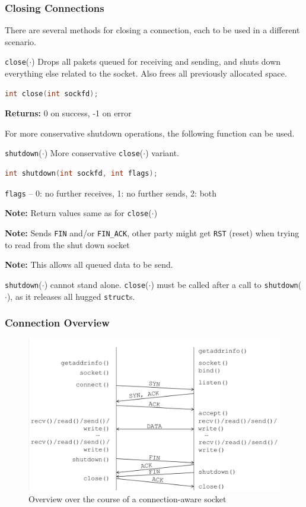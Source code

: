 \documentclass[english]{panikzettel}
\newcommand{\fkt}[1]{\texttt{#1}(\(\cdot\))}
\begin{document}
	\subsubsection{Closing Connections}

	There are several methods for closing a connection, each to be used in a different scenario.

	\begin{defi}{\fkt{close}}
		Drops all pakets queued for receiving and sending, and shuts down everything else related to the socket. Also frees all previously allocated space.
		\begin{lstlisting}[language=C]
			int close(int sockfd);
		\end{lstlisting}
		\tcblower
		\textbf{Returns:} 0 on success, -1 on error
	\end{defi}

	For more conservative shutdown operations, the following function can be used.

	\begin{defi}{\fkt{shutdown}}
		More conservative \fkt{close} variant.
		\begin{lstlisting}[language=C]
			int shutdown(int sockfd, int flags);
		\end{lstlisting}
		\tcblower
		\texttt{flags} – 0: no further receives, 1: no further sends, 2: both

		\textbf{Note:} Return values same as for \fkt{close}

		\textbf{Note:} Sends \texttt{FIN} and/or \texttt{FIN\_ACK}, other party might get \texttt{RST} (reset) when trying to read from the shut down socket

		\textbf{Note:} This allows all queued data to be send.
	\end{defi}

	\fkt{shutdown} cannot stand alone. 
	\fkt{close} must be called after a call to \fkt{shutdown}, as it releases all hugged \texttt{struct}s.

	\subsubsection{Connection Overview}

	\begin{figure}[H]
		\centering
		\includegraphics[width=\textwidth]{img/1-connection-overview.png}
		\caption{Overview over the course of a connection-aware socket}
		\label{img-1-connection-overview}
	\end{figure}
\end{document}
